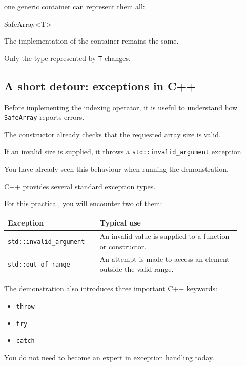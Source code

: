 \documentclass{csc2059practical}
\begin{document}
one generic container can represent them all:

\begin{cppcode}
SafeArray<T>
\end{cppcode}

The implementation of the container remains the same.

Only the type represented by \texttt{T} changes.

\subsection{A short detour: exceptions in C++}

Before implementing the indexing operator, it is useful to understand how \texttt{SafeArray} reports errors.

The constructor already checks that the requested array size is valid.

If an invalid size is supplied, it throws a \texttt{std::invalid_argument} exception.

You have already seen this behaviour when running the demonstration.

C++ provides several standard exception types.

For this practical, you will encounter two of them:

\begin{center}
\begin{tabular}{p{0.35\linewidth} p{0.55\linewidth}}
\toprule
\textbf{Exception} & \textbf{Typical use} \\
\midrule
\texttt{std::invalid_argument} & An invalid value is supplied to a function or constructor. \\
\texttt{std::out_of_range} & An attempt is made to access an element outside the valid range. \\
\bottomrule
\end{tabular}
\end{center}

The demonstration also introduces three important C++ keywords:

\begin{itemize}
    \item \texttt{throw}
    \item \texttt{try}
    \item \texttt{catch}
\end{itemize}

You do not need to become an expert in exception handling today.
\end{document}

